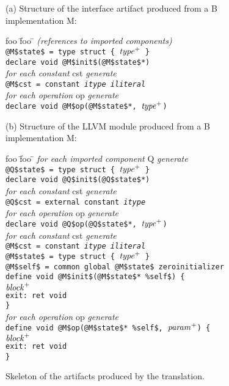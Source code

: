 \documentclass{llncs}
\newcommand{\llvm}[1]{\texttt{#1}}
\newcommand{\B}[1]{\textsf{#1}}
\newcommand{\ListOf}[1]{$\mbox{#1}^+$}
\newcommand{\nt}[1]{{\normalfont\textit{#1}}}
\begin{document}
\begin{figure}
  \begin{center}
    (a) Structure of the interface artifact produced from a B implementation \B{M}:
    \begin{tabbing}
      foo \= foo \= \kill
      \textit{(references to imported components)} \\
      \llvm{@M\$state\$ = type struct \{ \ListOf{\nt{type}} \}} \\
      \llvm{declare void @M\$init\$(@M\$state\$*)} \\
      \textit{for each constant} \B{cst} \textit{generate} \\
      \> \llvm{@M\$cst = constant \nt{itype} \nt{iliteral}} \\
      \textit{for each operation} \B{op} \textit{generate} \\
      \> \llvm{declare void @M\$op(@M\$state\$*, \ListOf{\nt{type}})} \\
    \end{tabbing}
    (b) Structure of the LLVM module produced from a B implementation \B{M}:
    \begin{tabbing}
      foo \= foo \= \kill
      \textit{for each imported component} \B{Q} \textit{generate} \\
      \> \llvm{@Q\$state\$ = type struct \{ \ListOf{\nt{type}} \}} \\
      \> \llvm{declare void @Q\$init\$(@Q\$state\$*)} \\
      \> \textit{for each constant} \B{cst} \textit{generate} \\
      \> \> \llvm{@Q\$cst = external constant \nt{itype}} \\
      \> \textit{for each operation} \B{op} \textit{generate} \\
      \> \> \llvm{declare void @Q\$op(@Q\$state\$*, \ListOf{\nt{type}})} \\
      \textit{for each constant} \B{cst} \textit{generate} \\
      \> \llvm{@M\$cst = constant \nt{itype} \nt{iliteral}} \\
      \llvm{@M\$state\$ = type struct \{ \ListOf{\nt{type}} \}} \\
      \llvm{@M\$self\$ = common global @M\$state\$ zeroinitializer} \\
      \llvm{define void @M\$init\$(@M\$state\$* \%self\$) \{} \\
      \> \llvm{\ListOf{\nt{block}}} \\
      \> \llvm{exit: ret void} \\
      \llvm{\}} \\
      \textit{for each operation} \B{op} \textit{generate} \\
      \> \llvm{define void @M\$op(@M\$state\$* \%self\$, \ListOf{\nt{param}}) \{} \\
      \> \> \llvm{\ListOf{\nt{block}}} \\
      \> \> \llvm{exit: ret void} \\
      \> \llvm{\}}
    \end{tabbing}
  \end{center}
  \caption{Skeleton of the artifacts produced by the translation.}
  \label{fig:skel}
\end{figure}
\end{document}
